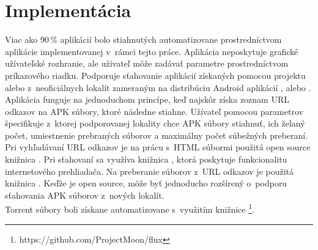 \section{Implementácia}
Viac ako 90\,\% aplikácií bolo stiahnutých automatizovane prostredníctvom aplikácie  implementovanej v~rámci tejto práce. Aplikácia neposkytuje grafické užívateľské rozhranie, ale užívateľ môže zadávať parametre prostredníctvom príkazového riadku. Podporuje sťahovanie aplikácií získaných pomocou projektu  alebo z~neoficiálnych lokalít zameraným na distribúciu Android aplikácií ,  alebo . Aplikácia funguje na jednoduchom princípe, keď najskôr získa zoznam URL odkazov na APK súbory, ktoré následne stiahne. Užívateľ pomocou parametrov špecifikuje z~ktorej podporovanej lokality chce APK súbory stiahnuť, ich želaný počet, umiestnenie prebraných súborov a maximálny počet súbežných preberaní. Pri vyhľadávaní URL odkazov je na prácu s~HTML súbormi použitá open source knižnica . Pri sťahovaní sa využíva knižnica , ktorá poskytuje funkcionalitu internetového prehliadača. Na preberanie súborov z~URL odkazov je použitá knižnica . Keďže je  open source, môže byť jednoducho rozšírený o~podporu sťahovania APK súborov z~nových lokalít.\\
Torrent súbory boli získane automatizovane s~využitím knižnice \footnote{https://github.com/ProjectMoon/flux}.